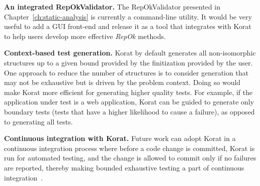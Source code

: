 \para \textbf{An integrated RepOkValidator.} The RepOkValidator
presented in Chapter~\ref{ch:static-analysis} is currently a
command-line utility.  It would be very useful to add a GUI front-end
and release it as a tool that integrates with Korat to help users
develop more effective \emph{RepOk} methods.

\begin{comment}
\para \textbf{Reflection instrumentation.}
Chapter~\ref{ch:adding-reflection} presented our technique that builds
on Korat to support the usage of reflection; however, our current
prototype tool implementation requires manually transforming the calls
to Java reflection API to our own reflection API (which mimics the
Java reflection API but also notifies Korat of field accesses).  An
additional simple engineering step that replaces calls to Java
reflection API to our API is required for fully automatic support of
allowing the use of reflection for field accesses.
\end{comment}

\para \textbf{Context-based test generation.} Korat by default
generates all non-isomorphic structures up to a given bound provided
by the finitization provided by the user. One approach to reduce the
number of structures is to consider generation that may not be
exhaustive but is driven by the problem context. Doing so would make
Korat more efficient for generating higher quality tests. For example,
if the application under test is a web application, Korat can be
guided to generate only boundary tests (tests that have a higher
likelihood to cause a failure), as opposed to generating all tests.

\para \textbf{Continuous integration with Korat.} Future work can
adopt Korat in a continuous integration process where before a code
change is committed, Korat is run for automated testing, and the
change is allowed to commit only if no failures are reported, thereby
making bounded exhaustive testing a part of continuous
integration~\cite{fowler2006continuous}.
